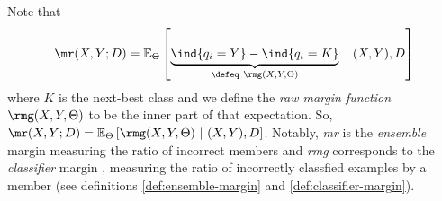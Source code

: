 \documentclass[
    a4paper, %
	fontsize=10pt, %
	twoside=false, %
]{kaobook}
\begin{document}

Note that
$$
\mr(X, Y;D) = \mathbb{E}_{\Theta}\left[ 
\underbrace{
\ind{q_{i}=Y} - \ind{q_{i}=K} 
}_{
\defeq ~\rmg(X, Y, \Theta) 
}
~|~(X,Y), D \right] 
$$
where $K$ is the next-best class and we define the \textit{raw margin function} $\rmg(X, Y, \Theta)$ to be the inner part of that expectation. So, 
$\mr(X, Y;D) = \mathbb{E}_{\Theta}\left[ 
\rmg(X, Y, \Theta) 
~|~(X,Y), D \right]$. Notably, \textit{mr} is the \textit{ensemble} margin measuring the ratio of incorrect members and \textit{rmg} corresponds to the \textit{classifier} margin
, measuring the ratio of incorrectly classfied examples by a member (see definitions \ref{def:ensemble-margin} and \ref{def:classifier-margin}).
\end{document}
